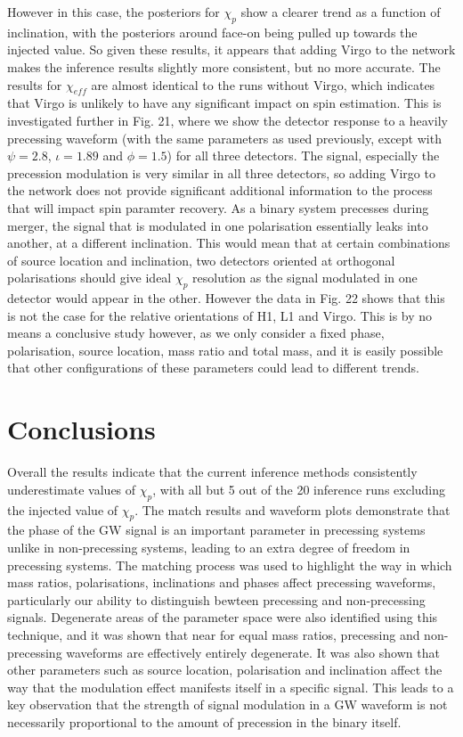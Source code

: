 \documentclass[11pt]{article}
\begin{document}
However in this case, the posteriors for $\chi_p$ show a clearer trend as a function of inclination, with the posteriors around face-on being pulled up towards the injected value. So given these results, it appears that adding Virgo to the network makes the inference results slightly more consistent, but no more accurate. The results for $\chi_{eff}$ are almost identical to the runs without Virgo, which indicates that Virgo is unlikely to have any significant impact on spin estimation.
This is investigated further in Fig. 21, where we show the detector response to a heavily precessing waveform (with the same parameters as used previously, except with $\psi=2.8$, $\iota=1.89$ and $\phi=1.5$) for all three detectors. The signal, especially the precession modulation is very similar in all three detectors, so adding Virgo to the network does not provide significant additional information to the process that will impact spin paramter recovery. As a binary system precesses during merger, the signal that is modulated in one polarisation essentially leaks into another, at a different inclination. This would mean that at certain combinations of source location and inclination, two detectors oriented at orthogonal polarisations should give ideal $\chi_p$ resolution as the signal modulated in one detector would appear in the other. However the data in Fig. 22 shows that this is not the case for the relative orientations of H1, L1 and Virgo. This is by no means a conclusive study however, as we only consider a fixed phase, polarisation, source location, mass ratio and total mass, and it is easily possible that other configurations of these parameters could lead to different trends.

\section{Conclusions}
Overall the results indicate that the current inference methods consistently underestimate values of $\chi_p$, with all but 5 out of the 20 inference runs excluding the injected value of $\chi_p$. The match results and waveform plots demonstrate that the phase of the GW signal is an important parameter in precessing systems unlike in non-precessing systems, leading to an extra degree of freedom in precessing systems. The matching process was used to highlight the way in which mass ratios, polarisations, inclinations and phases affect precessing waveforms, particularly our ability to distinguish bewteen precessing and non-precessing signals. Degenerate areas of the parameter space were also identified using this technique, and it was shown that near for equal mass ratios, precessing and non-precessing waveforms are effectively entirely degenerate. It was also shown that other parameters such as source location, polarisation and inclination affect the way that the modulation effect manifests itself in a specific signal. This leads to a key observation that the strength of signal modulation in a GW waveform is not necessarily proportional to the amount of precession in the binary itself.
\end{document}
